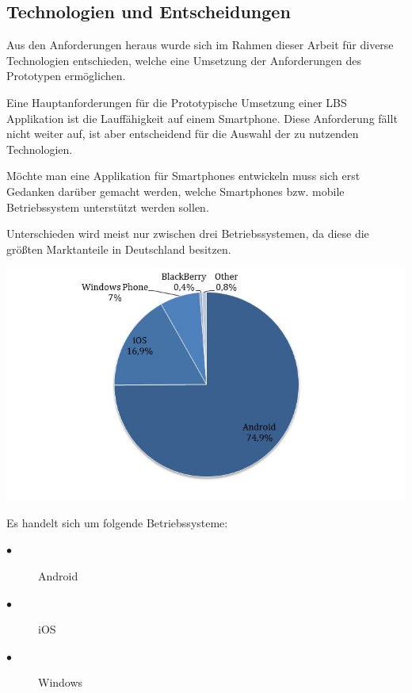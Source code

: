 \subsection{Technologien und Entscheidungen}




Aus den Anforderungen heraus wurde sich im Rahmen dieser Arbeit für diverse Technologien entschieden, welche eine Umsetzung der Anforderungen des Prototypen ermöglichen.


Eine Hauptanforderungen für die Prototypische Umsetzung einer LBS Applikation ist 
die Lauffähigkeit auf einem Smartphone. Diese Anforderung fällt nicht weiter auf, 
ist aber entscheidend für die Auswahl der zu nutzenden Technologien.

Möchte man eine Applikation für Smartphones entwickeln muss sich erst Gedanken 
darüber gemacht werden, welche Smartphones bzw. mobile Betriebssystem unterstützt 
werden sollen.

Unterschieden wird meist nur zwischen drei Betriebssystemen, da diese die größten 
Marktanteile in Deutschland besitzen. 

\includegraphics[width=1\textwidth]{ref/images/marktanteil.jpg} 


Es handelt sich um folgende Betriebssysteme: 
\begin{description}
  \item[$\bullet$] Android
  \item[$\bullet$] iOS
  \item[$\bullet$] Windows
\end{description}


